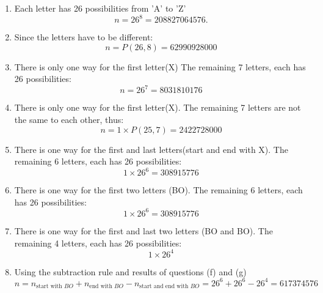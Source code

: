 \documentclass[a4paper]{article}
\begin{document}
\begin{enumerate}[label = \textbf{\alph*)}]
	\item Each letter has 26 possibilities from 'A' to 'Z'
	      \begin{equation*}
		      n = 26^{8} = 208827064576.
	      \end{equation*}
	\item Since the letters have to be different:
	      \begin{equation*}
		      n = P(26,8) = 62990928000 
	      \end{equation*}
	\item There is only one way for the first letter(X) The remaining 7 letters, each has 26 possibilities:
	      \begin{equation*}
		      n = 26^{7} = 8031810176
	      \end{equation*}
	\item There is only one way for the first letter(X). The remaining 7 letters are not the same to each other, thus:
	      \begin{equation*}
		      n = 1 \times P(25,7) = 2422728000
	      \end{equation*}
	\item There is one way for the first and last letters(start and end with X). The remaining 6 letters, each has 26 possibilities:
	      \begin{equation*}
		      1 \times 26^{6} = 308915776
	      \end{equation*}
	\item There is one way for the first two letters (BO). The remaining 6 letters, each has 26 possibilities:
	      \begin{equation*}
		      1 \times 26^{6} = 308915776
	      \end{equation*}
	\item There is one way for the first and last two letters (BO and BO). The remaining 4 letters, each has 26 possibilities:
	      \begin{equation*}
		      1 \times 26^{4}
	      \end{equation*}
	\item Using the subtraction rule and results of questions (f) and (g)
	      \begin{equation*}
		      n = n_{\text{start with }BO} + n_{\text{end with }BO} - n_{\text{start and end with }BO } = 26^{6} + 26^{6} - 26^{4}
		      = 617374576
	      \end{equation*}
\end{enumerate}
\end{document}

